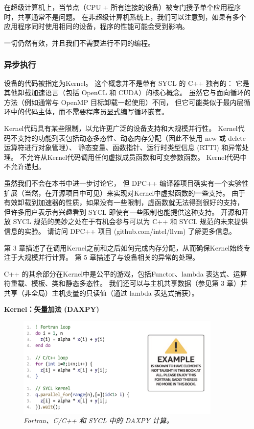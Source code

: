 在超级计算机上，当节点（CPU + 所有连接的设备）被专门授予单个应用程序时，共享通常不是问题。 
在非超级计算机系统上，我们可以注意到，如果有多个应用程序同时使用相同的设备，程序的性能可能会受到影响。

一切仍然有效，并且我们不需要进行不同的编程。

\subsubsection{异步执行}
设备的代码被指定为Kernel。 这个概念并不是带有 SYCL 的 C++ 独有的：
它是其他卸载加速语言（包括 OpenCL 和 CUDA）的核心概念。 
虽然它与面向循环的方法（例如通常与 OpenMP 目标卸载一起使用）不同，
但它可能类似于最内层循环中的代码主体，而不需要程序员显式编写循环嵌套。

Kernel代码具有某些限制，以允许更广泛的设备支持和大规模并行性。 
Kernel代码不支持的功能列表包括动态多态性、动态内存分配（因此不使用 new 或 delete 运算符进行对象管理）、
静态变量、函数指针、运行时类型信息 (RTTI) 和异常处理。 不允许从Kernel代码调用任何虚拟成员函数和可变参数函数。 
Kernel代码中不允许递归。

\begin{remark}[虚函数]
	虽然我们不会在本书中进一步讨论它，
	但 DPC++ 编译器项目确实有一个实验性扩展（当然，在开源项目中可见）来实现对Kernel中虚拟函数的一些支持。 
	由于有效卸载到加速器的性质，如果没有一些限制，虚函数就无法得到很好的支持，
	但许多用户表示有兴趣看到 SYCL 即使有一些限制也能提供这种支持。 
	开源和开放 SYCL 规范的美妙之处在于有机会参与可以为 C++ 和 SYCL 规范的未来提供信息的实验。 
	请访问 DPC++ 项目 (github.com/intel/llvm) 了解更多信息。
\end{remark}

第 3 章描述了在调用Kernel之前和之后如何完成内存分配，从而确保Kernel始终专注于大规模并行计算。 
第 5 章描述了与设备相关的异常的处理。

C++ 的其余部分在Kernel中是公平的游戏，包括Functor、lambda 表达式、运算符重载、模板、类和静态多态性。 
我们还可以与主机共享数据（参见第 3 章）并共享（非全局）主机变量的只读值（通过 lambda 表达式捕获）。

\textbf{Kernel：矢量加法 (DAXPY)}

\begin{figure}[H]
	\centering
	\includegraphics[width=0.9\textwidth]{figs/F1.2.png}
	\caption{\textit{Fortran、C/C++ 和 SYCL 中的 DAXPY 计算。}}
\end{figure}


